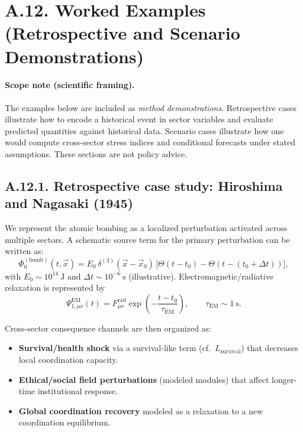 \documentclass[13pt,a4paper]{article}
\begin{document}
	\section*{A.12. Worked Examples (Retrospective and Scenario Demonstrations)}
	\label{sec:worked-examples}
	
	\paragraph{Scope note (scientific framing).}
	The examples below are included as \emph{method demonstrations}. Retrospective cases illustrate how to encode a historical event in sector variables and evaluate predicted quantities against historical data. Scenario cases illustrate how one would compute cross-sector stress indices and conditional forecasts under stated assumptions. These sections are not policy advice.
	
	\subsection*{A.12.1. Retrospective case study: Hiroshima and Nagasaki (1945)}
	
	We represent the atomic bombing as a localized perturbation activated across multiple sectors. A schematic source term for the primary perturbation can be written as:
	$$
	\Phi_{0}^{(\mathrm{bomb})}(t,\vec{x}) = E_0\,\delta^{(3)}(\vec{x}-\vec{x}_0)\,\big[\Theta(t-t_0)-\Theta(t-(t_0+\Delta t))\big],
	$$
	with $E_0\sim 10^{14}\ \mathrm{J}$ and $\Delta t\sim 10^{-6}\ \mathrm{s}$ (illustrative). Electromagnetic/radiative relaxation is represented by
	$$
	\Psi_{1,\mu\nu}^{\mathrm{EM}}(t)=F_{\mu\nu}^{\mathrm{rad}}\exp\!\left(-\frac{t-t_0}{\tau_{\mathrm{EM}}}\right),\qquad \tau_{\mathrm{EM}}\sim 1\ \mathrm{s}.
	$$
	
	Cross-sector consequence channels are then organized as:
	\begin{itemize}[leftmargin=*]
		\item \textbf{Survival/health shock} via a survival-like term (cf.\ $L_{\mathrm{survival}}$) that decreases local coordination capacity.
		\item \textbf{Ethical/social field perturbations} (modeled modules) that affect longer-time institutional response.
		\item \textbf{Global coordination recovery} modeled as a relaxation to a new coordination equilibrium.
	\end{itemize}
	
\end{document}
